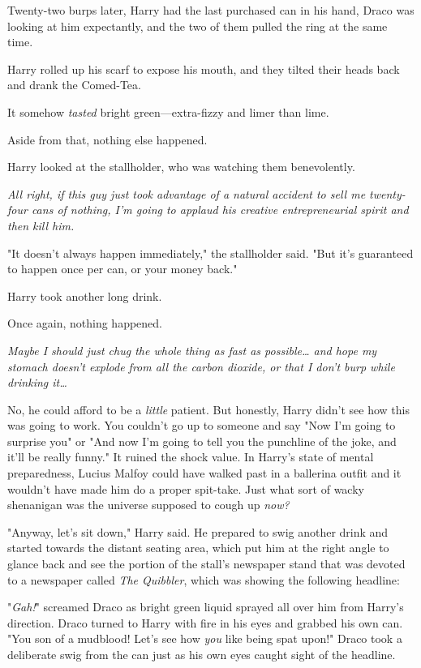 Twenty-two burps later, Harry had the last purchased can in his hand, Draco was 
looking at him expectantly, and the two of them pulled the ring at the same 
time.

Harry rolled up his scarf to expose his mouth, and they tilted their heads back 
and drank the Comed-Tea.

It somehow \emph{tasted} bright green---extra-fizzy and limer than lime.

Aside from that, nothing else happened.

Harry looked at the stallholder, who was watching them benevolently.

\emph{All right, if this guy just took advantage of a natural accident to sell 
me twenty-four cans of nothing, I'm going to applaud his creative 
entrepreneurial spirit and then kill him.}

"It doesn't always happen immediately," the stallholder said. "But it's 
guaranteed to happen once per can, or your money back."

Harry took another long drink.

Once again, nothing happened.

\emph{Maybe I should just chug the whole thing as fast as possible{\ldots} and 
hope my stomach doesn't explode from all the carbon dioxide, or that I don't 
burp while drinking it{\ldots}}

No, he could afford to be a \emph{little} patient. But honestly, Harry didn't 
see how this was going to work. You couldn't go up to someone and say "Now I'm 
going to surprise you" or "And now I'm going to tell you the punchline of the 
joke, and it'll be really funny." It ruined the shock value. In Harry's state 
of mental preparedness, Lucius Malfoy could have walked past in a ballerina 
outfit and it wouldn't have made him do a proper spit-take. Just what sort of 
wacky shenanigan was the universe supposed to cough up \emph{now?}

"Anyway, let's sit down," Harry said. He prepared to swig another drink and 
started towards the distant seating area, which put him at the right angle to 
glance back and see the portion of the stall's newspaper stand that was devoted 
to a newspaper called \emph{The Quibbler}, which was showing the following 
headline:


"\emph{Gah!}" screamed Draco as bright green liquid sprayed all over him from 
Harry's direction. Draco turned to Harry with fire in his eyes and grabbed his 
own can. "You son of a mudblood! Let's see how \emph{you} like being spat 
upon!" Draco took a deliberate swig from the can just as his own eyes caught 
sight of the headline.

